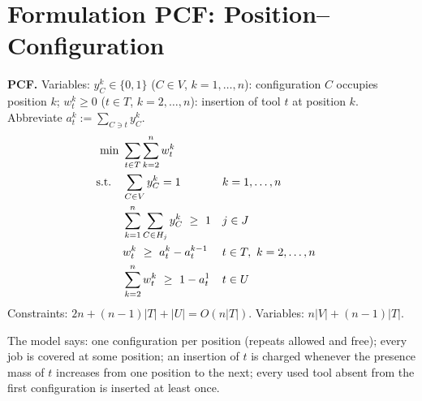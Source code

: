 \documentclass[11pt,a4paper]{article}
\theoremstyle{plain}
\theoremstyle{definition}
\begin{document}
\section{Formulation PCF: Position--Configuration}
\label{sec:pcf}

\begin{formbox}
\textbf{PCF.} Variables: $y_C^k\in\{0,1\}$ ($C\in V$, $k=1,\dots,n$): configuration
$C$ occupies position $k$; $w_t^k\ge0$ ($t\in T$, $k=2,\dots,n$): insertion of tool
$t$ at position $k$. Abbreviate $a_t^k:=\sum_{C\ni t}y_C^k$.
\begin{align}
  \min\ & \sum_{t\in T}\sum_{k=2}^{n} w_t^k \notag\\
  \text{s.t.}\quad & \sum_{C\in V} y_C^k = 1 && k=1,\dots,n \label{eq:P}\\
  & \sum_{k=1}^{n}\sum_{C\in H_j} y_C^k \ \ge\ 1 && j\in J \label{eq:C}\\
  & w_t^k \ \ge\ a_t^k - a_t^{k-1} && t\in T,\ k=2,\dots,n \label{eq:W}\\
  & \sum_{k=2}^{n} w_t^k \ \ge\ 1 - a_t^1 && t\in U \label{eq:T}
\end{align}
Constraints: $2n+(n-1)|T|+|U| = O(n|T|)$. Variables: $n|V|+(n-1)|T|$.
\end{formbox}

The model says: one configuration per position (repeats allowed and free); every job
is covered at some position; an insertion of $t$ is charged whenever the presence
mass of $t$ increases from one position to the next; every used tool absent from the
first configuration is inserted at least once.
\end{document}
